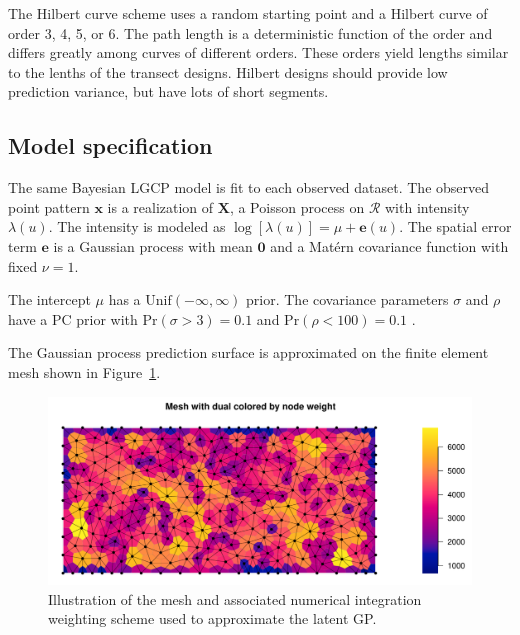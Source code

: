 \documentclass[review]{elsarticle}
\begin{document}
The Hilbert curve scheme uses a random starting point and a Hilbert curve of
order 3, 4, 5, or 6. The path length is a deterministic function of the order
and differs greatly among curves of different orders. These orders yield
lengths similar to the lenths of the transect designs. Hilbert designs should
provide low prediction variance, but have lots of short segments.


\subsection{Model specification}

The same Bayesian LGCP model is fit to each observed dataset. The observed
point pattern \(\mathbf{x}\) is a realization of \(\mathbf{X}\), a Poisson
process on \(\mathcal{R}\) with intensity \(\lambda(u)\). The intensity is
modeled as \(\log[\lambda(u)] = \mu + \mathbf{e}(u)\). The spatial error term
\(\mathbf{e}\) is a Gaussian process with mean \(\mathbf{0}\) and a
Mat\'{e}rn covariance function with fixed \(\nu = 1\).

The intercept \(\mu\) has a \(\mathrm{Unif}(-\infty, \infty)\) prior.
The covariance parameters \(\sigma\) and \(\rho\) have a PC prior with
\(\mathrm{Pr}(\sigma > 3) = 0.1\) and \(\mathrm{Pr}(\rho < 100) = 0.1\)
\citep{fuglstadetal,simpsonpc}.

The Gaussian process prediction surface is approximated on the finite element
mesh shown in Figure~\ref{meshfull}.

\begin{figure}
\includegraphics[width=5in]{mesh_full.pdf}
\caption{Illustration of the mesh and associated numerical integration
weighting scheme used to approximate the latent GP.}
\label{meshfull}
\end{figure}


\end{document}
